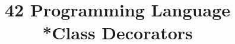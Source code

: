 \documentclass[secfooter,english]{beamer}
\title{42 Programming Language\\*Class Decorators}
\author{}
\institute{}
\date{}
\begin{document}
\maketitle


\logo{}

\end{document}
